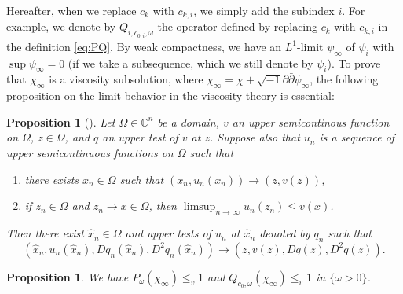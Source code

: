 \documentclass[10pt,a4paper]{amsart}
\numberwithin{equation}{section}
\newtheorem{prop}[equation]{Proposition}
\newcommand{\delb}{\sqrt{-1}\partial\bar{\partial}}
\begin{document}
    Hereafter, when we replace $c_k$ with $c_{k,i}$, we simply add the subindex $i$. For example, we denote by $Q_{i,c_{0,i},\omega}$ the operator defined by replacing $c_k$ with $c_{k,i}$ in the definition \eqref{eq:PQ}. 
    By weak compactness, we have an $L^1$-limit $\psi_\infty$ of $\psi_i$ with $\sup{\psi_\infty}=0$ (if we take a subsequence, which we still denote by $\psi_i$). To prove that $\chi_\infty$ is a viscosity subsolution, where $\chi_\infty=\chi+\delb\psi_\infty$, the following proposition on the limit behavior in the viscosity theory is essential:

\begin{prop}[{\cite[Proposition 4.3]{CIL}}]\label{propCIL}
    Let $\Omega \in \mathbb{C}^n$ be a domain, $v$ an upper semicontinous function on $\Omega$, $z \in \Omega$, and $q$ an upper test of $v$ at $z$. Suppose also that $u_n$ is a sequence of upper semicontinuous functions on $\Omega$ such that
    \begin{enumerate}[label={\upshape(\roman*)}]
        \item\label{itemCIL1} there exists $x_n \in \Omega$ such that $(x_n,u_n(x_n)) \rightarrow (z,v(z))$,
        \item\label{itemCIL2} if $z_n \in \Omega$ and $z_n \rightarrow x\in\Omega$, then $\limsup_{n\rightarrow\infty}u_n(z_n)\le v(x)$.
    \end{enumerate}
    Then there exist $\hat{x}_n\in \Omega$ and upper tests of $u_n$ at $\hat{x}_n$ denoted by $q_n$ such that
    $$(\hat{x}_n,u_n(\hat{x}_n),Dq_n(\hat{x}_n),D^2q_n(\hat{x}_n))\rightarrow(z,v(z),Dq(z),D^2q(z)).$$
\end{prop}

\begin{prop}\label{prop:vsub}
    We have $P_\omega(\chi_\infty)\le_v 1$ and $Q_{c_0,\omega}(\chi_\infty)\le_v 1$ in $\{\omega>0\}$.
\end{prop}
\end{document}
